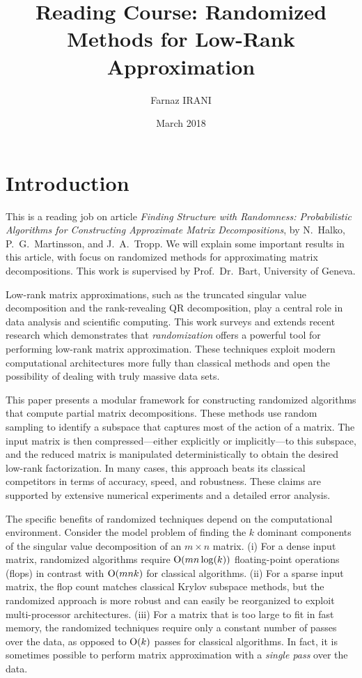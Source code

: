 \documentclass{article}
\title{Reading Course: Randomized Methods for Low-Rank Approximation}
\author{Farnaz IRANI}
\date{March 2018}
\begin{document}
\maketitle

\section{Introduction}
This is a reading job on article \textit{Finding Structure with Randomness: Probabilistic Algorithms for Constructing Approximate Matrix Decompositions}, by N.~Halko, P.~G.~Martinsson, and J.~A.~Tropp.
We will explain some important results in this article, with focus on randomized methods for approximating matrix decompositions. This work is supervised by Prof.~Dr.~Bart, University of Geneva.

Low-rank matrix approximations, such as the truncated singular value
decomposition and the rank-revealing QR decomposition, play a central
role in data analysis and scientific computing. This work surveys and
extends
recent research which demonstrates that \emph{randomization} offers a
powerful tool for performing low-rank matrix approximation.
These
techniques exploit modern computational architectures
more fully than classical methods and open the possibility of
dealing with truly massive data sets.

This paper presents a modular framework for constructing randomized
algorithms that compute partial matrix decompositions. These methods
use random sampling
to identify a subspace that captures most of the action
of a matrix. The input matrix is then compressed---either explicitly
or implicitly---to this subspace, and the reduced matrix is
manipulated deterministically to obtain the desired low-rank
factorization. In many cases, this approach beats its classical
competitors in terms of accuracy, speed, and robustness.
These claims
are supported by extensive numerical experiments and a detailed error
analysis.

The specific benefits of randomized techniques depend on the
computational environment. Consider the model problem of finding
the $k$ dominant components of the singular value decomposition
of an $m \times n$ matrix.
(i) For a dense input matrix, randomized algorithms require $\mathrm{O}(mn
\log(k))$ floating-point operations (flops) in contrast with $
\mathrm{O}(mnk)$ for classical algorithms.
%
(ii) For a sparse input matrix, the flop count matches classical
Krylov subspace methods, but the randomized approach is more robust
and can easily be reorganized to exploit multi-processor architectures.
(iii) For a matrix that is too large to fit in fast memory, the randomized
techniques require only a constant number of passes over the data,
as opposed to $\mathrm{O}(k)$ passes for classical algorithms.
In fact, it is sometimes possible to perform matrix approximation with a
\emph{single pass} over the data.
\end{document}
